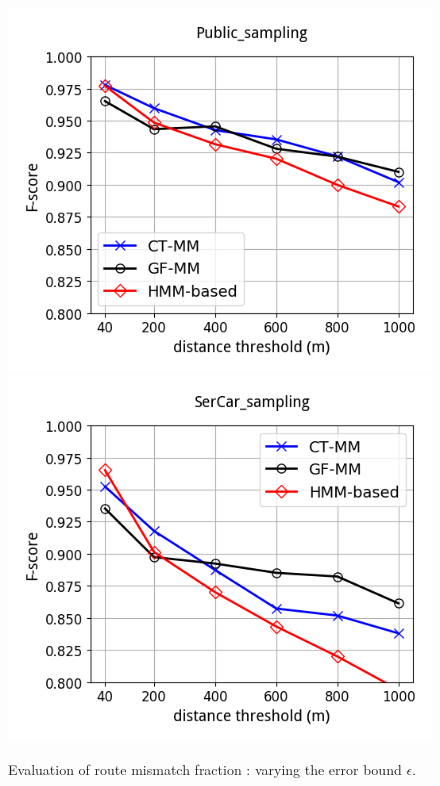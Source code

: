 \begin{figure}[tb!]
	\centering
  \includegraphics[height=0.3\textwidth]{Figures/Exp-epsilon-f-score-cmp_matcher_sampling-Public.png}\hspace{5ex}
  \includegraphics[height=0.3\textwidth]{Figures/Exp-epsilon-f-score-cmp_matcher_sampling-SerCar.png}\hspace{5ex}
	\vspace{-2.5ex}
  \caption{\small Evaluation of route mismatch fraction : varying the error bound $\epsilon$.}
	\label{fig:rmf-epsilon}
	\vspace{-2ex}
\end{figure}

